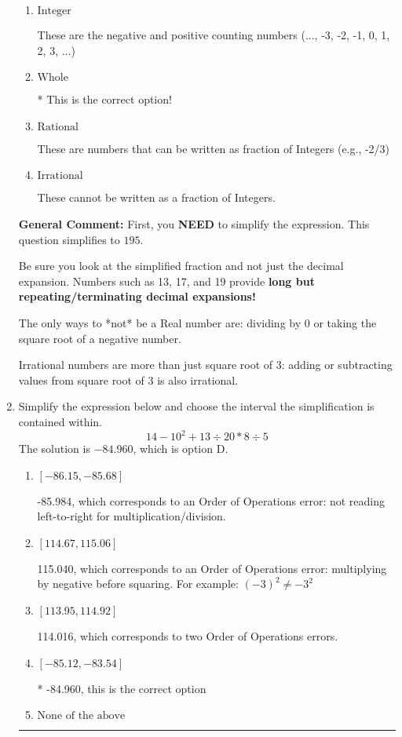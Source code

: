 \documentclass{extbook}[14pt]
\newcommand{\litem}[1]{\item #1

\rule{\textwidth}{0.4pt}}
\begin{document}
\begin{enumerate}
{\begin{enumerate}[label=\Alph*.]
These are Nonreal Complex numbers \textbf{OR} things that are not numbers (e.g., dividing by 0).
\item \( \text{Integer} \)

These are the negative and positive counting numbers (..., -3, -2, -1, 0, 1, 2, 3, ...)
\item \( \text{Whole} \)

* This is the correct option!
\item \( \text{Rational} \)

These are numbers that can be written as fraction of Integers (e.g., -2/3)
\item \( \text{Irrational} \)

These cannot be written as a fraction of Integers.
\end{enumerate}

\textbf{General Comment:} First, you \textbf{NEED} to simplify the expression. This question simplifies to $195$. 
 
 Be sure you look at the simplified fraction and not just the decimal expansion. Numbers such as 13, 17, and 19 provide \textbf{long but repeating/terminating decimal expansions!} 
 
 The only ways to *not* be a Real number are: dividing by 0 or taking the square root of a negative number. 
 
 Irrational numbers are more than just square root of 3: adding or subtracting values from square root of 3 is also irrational.
}
\litem{
Simplify the expression below and choose the interval the simplification is contained within.
\[ 14 - 10^2 + 13 \div 20 * 8 \div 5 \]The solution is \( -84.960 \), which is option D.\begin{enumerate}[label=\Alph*.]
\item \( [-86.15, -85.68] \)

 -85.984, which corresponds to an Order of Operations error: not reading left-to-right for multiplication/division.
\item \( [114.67, 115.06] \)

 115.040, which corresponds to an Order of Operations error: multiplying by negative before squaring. For example: $(-3)^2 \neq -3^2$
\item \( [113.95, 114.92] \)

 114.016, which corresponds to two Order of Operations errors.
\item \( [-85.12, -83.54] \)

* -84.960, this is the correct option
\item \( \text{None of the above} \)


\end{enumerate}}
\end{enumerate}
\end{document}
